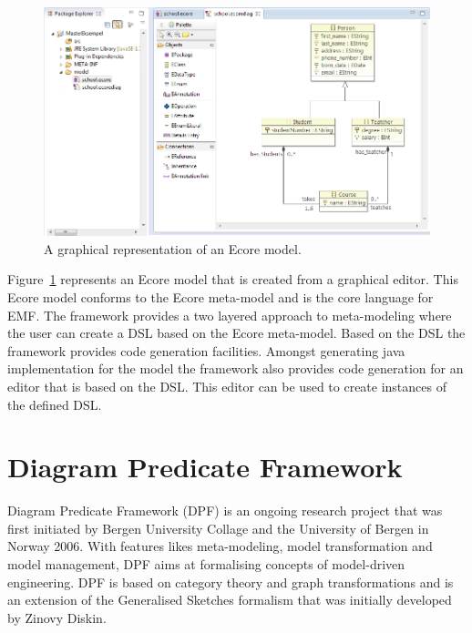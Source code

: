 \begin{figure}[H]
	\centering
	\includegraphics[scale=0.6]{./Figures/EMF_Diagram_Picture.png}
	\caption[Ecore model represented by Ecore Tools]
	{A graphical representation of an Ecore model.}
	\label{fig:EMF_Diagram}
\end{figure}

Figure~\ref{fig:EMF_Diagram} represents an Ecore model that is created from a
graphical editor. This Ecore model conforms to the Ecore meta-model and is the
core language for EMF. The framework provides a two layered approach to
meta-modeling where the user can create a DSL based on the Ecore meta-model.
Based on the DSL the framework provides code generation facilities. Amongst
generating java implementation for the model the framework also provides code
generation for an editor that is based on the DSL. This editor can be used to
create instances of the defined DSL. 



\section{Diagram Predicate Framework}
\label{sec:DPF}

Diagram Predicate Framework\cite{Rutle_thesis,Rossini_thesis,Lamo2013} (DPF) is
an ongoing research project that was first initiated by Bergen University
Collage and the University of Bergen in Norway 2006. With features likes
meta-modeling, model transformation and model management, DPF aims at
formalising concepts of model-driven engineering. DPF is based on category
theory and graph transformations and is an extension of the Generalised
Sketches\cite{Diskin2003} formalism that was initially developed by Zinovy
Diskin.

